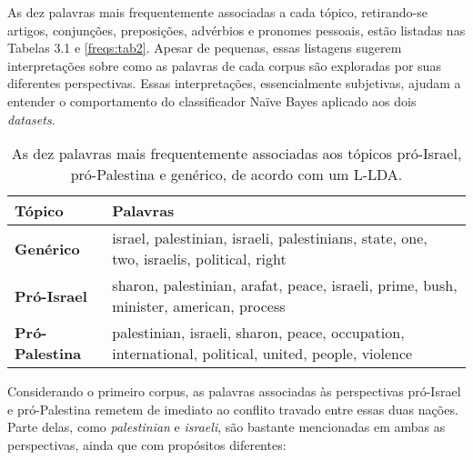 
As dez palavras mais frequentemente associadas a cada tópico, retirando-se artigos, conjunções, preposições, advérbios e pronomes pessoais, estão listadas nas Tabelas 3.1 e \ref{freqs:tab2}. Apesar de pequenas, essas listagens sugerem interpretações sobre como as palavras de cada corpus são exploradas por suas diferentes perspectivas. Essas interpretações, essencialmente  subjetivas, ajudam a entender o comportamento do classificador Naïve Bayes aplicado aos dois \emph{datasets}.%




\begin{table}[h]
\label{tab1}
\centering
\begin{tabular}{| l | p{10cm} | }
\hline
\textbf{Tópico} & \textbf{Palavras} \\ \hline
\textbf{Genérico} & israel, palestinian, israeli, palestinians, state, one, two, israelis, political, right \\ \hline
\textbf{Pró-Israel} & sharon, palestinian, arafat, peace, israeli, prime, bush, minister, american, process \\ \hline
\textbf{Pró-Palestina} & palestinian, israeli, sharon, peace, occupation, international, political, united, people, violence \\ \hline
\end{tabular}
\caption{As dez palavras mais frequentemente associadas aos tópicos pró-Israel, pró-Palestina e genérico, de acordo com um L-LDA.}
\end{table}


Considerando o primeiro corpus, as palavras associadas às perspectivas pró-Israel e pró-Palestina remetem de imediato ao conflito travado entre essas duas nações. Parte delas, como \emph{palestinian} e \emph{israeli}, são bastante mencionadas em ambas as perspectivas, ainda que com propósitos diferentes: %

